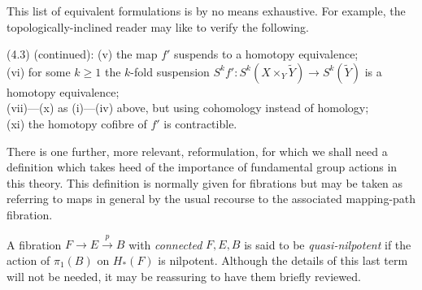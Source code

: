 This list of equivalent formulations is by no means exhaustive. For example, the topologically-inclined reader may like to verify the following.

(4.3) (continued): (v) the map $f'$ suspends to a homotopy equivalence;\\
(vi) for some $k \geqslant 1 $ the $k$-fold suspension $S^kf' \colon   S^k(X\times_Y\widetilde{Y}) \longrightarrow S^k(\widetilde{Y})$ is a homotopy equivalence;\\
(vii)---(x) as (i)---(iv) above, but using cohomology instead of homology;\\
(xi) the homotopy cofibre of $f'$ is contractible.

There is one further, more relevant, reformulation, for which we shall need a definition which takes heed of the importance of fundamental group actions in this theory. This definition is normally given for fibrations but may be taken as referring to maps in general by the usual recourse to the associated mapping-path fibration.

A fibration $F\longrightarrow E\overset{p}\longrightarrow B$ with {\em connected} $F, E, B$ is said to be {\em quasi-nilpotent} if the action of $\pi_1(B)$ on $H_*(F)$ is nilpotent. Although the details of this last term will not be needed, it may be reassuring to have them briefly reviewed.

